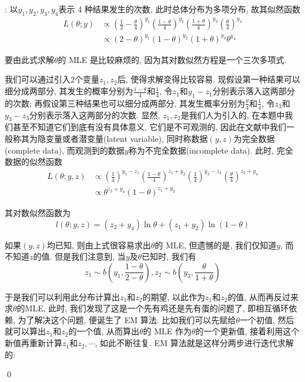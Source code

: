 \documentclass[a4paper,UTF8]{ctexart}
\theoremstyle{plain} \newtheorem{theorem}{定理}[section]
\theoremstyle{plain} \newtheorem{definition}{定义}[section]
\theoremstyle{plain} \newtheorem{lemma}{引理}[section]
\theoremstyle{plain} \newtheorem{proposition}{命题}[section]
\theoremstyle{plain} \newtheorem{example}{例}
\theoremstyle{plain} \newtheorem{remark}{注}
\theoremstyle{plain} \newtheorem{corollary}{推论}[section]
\newenvironment{mysolution}{{\color{blue} 解}: }{{\color{magenta}\qed}}
\begin{document}
\begin{mysolution}
以$y_{1}, y_{2}, y_{3}, y_{4}$表示 4 种结果发生的次数, 此时总体分布为多项分布, 故其似然函数
\begin{align*}
L(\theta; y) & \propto \left( \frac{1}{2} - \frac{\theta}{4} \right)^{y_1} \left( \frac{1-\theta}{4} \right)^{y_2} \left( \frac{1+\theta}{4} \right)^{y_3} \left( \frac{\theta}{4} \right)^{y_4} \\
& \propto (2-\theta)^{y_1} (1-\theta)^{y_2} (1+\theta)^{y_3} \theta^{y_4}
\end{align*}

要由此式求解$\theta$的 MLE 是比较麻烦的, 因为其对数似然方程是一个三次多项式.

我们可以通过引入$2$个变量$z_{1}, z_{2}$后, 使得求解变得比较容易. 现假设第一种结果可以细分成两部分, 其发生的概率分别为$\frac{1 - \theta}{4}$和$\frac{1}{4}$, 令$z_{1}$和$y_{1} - z_{1}$分别表示落入这两部分的次数; 再假设第三种结果也可以细分成两部分, 其发生概率分别为$\frac{\theta}{4}$和$\frac{1}{4}$, 令$z_{3}$和$y_{3} - z_{3}$分别表示落入这两部分的次数. 显然, $z_{1},z_{2}$是我们人为引入的, 在本题中我们甚至不知道它们到底有没有具体意义, 它们是不可观测的, 因此在文献中我们一般称其为隐变量或者潜变量(latent variable), 同时称数据$(y, z)$为完全数据(complete data), 而观测到的数据$y$称为不完全数据(incomplete data). 此时, 完全数据的似然函数
\begin{align*}
L(\theta; y, z) & \propto \left( \frac{1}{4} \right)^{y_{1} - z_{1}} \left( \frac{1 - \theta}{4} \right)^{z_{1} + y_{2}} \left( \frac{1}{4} \right)^{y_{3} - z_{2}} \left( \frac{\theta}{4} \right)^{z_{2} + y_{4}} \\
& \propto \theta^{z_{2} + y_{4}} (1 - \theta)^{z_{1} + y_{2}}
\end{align*}

其对数似然函数为
\begin{equation*}
l(\theta; y, z) = (z_{2} + y_{4}) \ln \theta + (z_{1} + y_{2}) \ln (1 - \theta) 
\end{equation*}

如果$(y, z)$均已知, 则由上式很容易求出$\theta$的 MLE, 但遗憾的是, 我们仅知道$y$, 而不知道$z$的值. 但是我们注意到, 当$y$及$\theta$已知时, 我们有
\begin{equation*}
z_{1} \sim b \left( y_{1}, \frac{1 - \theta}{2 - \theta} \right), z_{2} \sim b \left( y_{3}, \frac{\theta}{1 + \theta} \right)
\end{equation*}

{\color{red}于是我们可以利用此分布计算出$z_{1}$和$z_{2}$的期望, 以此作为$z_{1}$和$z_{2}$的值, 从而再反过来求$\theta$的MLE}, 此时, 我们发现了这是一个先有鸡还是先有蛋的问题了, 即相互循环依赖, 为了解决这个问题, 便诞生了 EM 算法. 比如我们可以先赋给$\theta$一个初值, 然后就可以算出$z_{1}$和$z_{2}$的一个值, 从而算出$\theta$的 MLE 作为$\theta$的一个更新值, 接着利用这个新值再重新计算$z_{1}$和$z_{2}, \cdots$, 如此不断往复. EM 算法就是这样分两步进行迭代求解的:


\end{mysolution}
\end{document}
